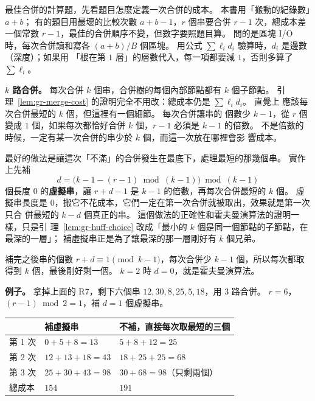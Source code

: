 \begin{examnote}
最佳合併的計算題，先看題目怎麼定義一次合併的成本。 本書用「搬動的紀錄數」$a + b$；
有的題目用最壞的比較次數 $a + b - 1$，$r$ 個串要合併 $r - 1$ 次，總成本差一個常數
$r - 1$，最佳的合併順序不變，但數字要照題目算。 問的是區塊 I/O 時，每次合併讀和寫各
$(a + b)/B$ 個區塊。 用公式 $\sum \ell_i d_i$ 驗算時，$d_i$ 是邊數（深度）；如果用
「根在第 $1$ 層」的層數代入，每一項都要減 $1$，否則多算了 $\sum \ell_i$。
\end{examnote}

\textbf{$k$ 路合併。} 每次合併 $k$ 個串，合併樹的每個內部節點都有 $k$ 個子節點。 引
理~\ref{lem:gr-merge-cost} 的證明完全不用改：總成本仍是 $\sum \ell_i d_i$。 直覺上
應該每次合併最短的 $k$ 個，但這裡有一個細節。 每次合併讓串的
個數少 $k - 1$，從 $r$ 個變成 $1$ 個，如果每次都恰好合併 $k$ 個，$r - 1$ 必須是
$k - 1$ 的倍數。 不是倍數的時候，一定有某一次合併的串少於 $k$ 個，而這一次放在哪裡會影
響成本。

最好的做法是讓這次「不滿」的合併發生在最底下，處理最短的那幾個串。 實作上先補
\[
d = \bigl(k - 1 - (r - 1) \bmod (k - 1)\bigr) \bmod (k - 1)
\]
個長度 $0$ 的\textbf{虛擬串}，讓 $r + d - 1$ 是 $k - 1$ 的倍數，再每次合併最短的 $k$
個。 虛擬串長度是 $0$，搬它不花成本，它們一定在第一次合併就被取出，效果就是第一次只合
併最短的 $k - d$ 個真正的串。 這個做法的正確性和霍夫曼演算法的證明一樣，只是引
理~\ref{lem:gr-huff-choice} 改成「最小的 $k$ 個是同一個節點的子節點，在最深的一層」；
補虛擬串正是為了讓最深的那一層剛好有 $k$ 個兄弟。

補完之後串的個數 $r + d \equiv 1 \pmod{k - 1}$，每次合併少 $k - 1$ 個，所以每次都取得到
$k$ 個，最後剛好剩一個。 $k = 2$ 時 $d = 0$，就是霍夫曼演算法。

\textbf{例子。} 拿掉上面的 R7，剩下六個串 $12, 30, 8, 25, 5, 18$，用 $3$ 路合併。
$r = 6$，$(r - 1) \bmod 2 = 1$，補 $d = 1$ 個虛擬串。

\begin{center}
\begin{tabular}{lll}
\toprule
 & 補虛擬串 & 不補，直接每次取最短的三個 \\
\midrule
第 1 次 & $0 + 5 + 8 = 13$ & $5 + 8 + 12 = 25$ \\
第 2 次 & $12 + 13 + 18 = 43$ & $18 + 25 + 25 = 68$ \\
第 3 次 & $25 + 30 + 43 = 98$ & $30 + 68 = 98$（只剩兩個） \\
\midrule
總成本 & $154$ & $191$ \\
\bottomrule
\end{tabular}
\end{center}

